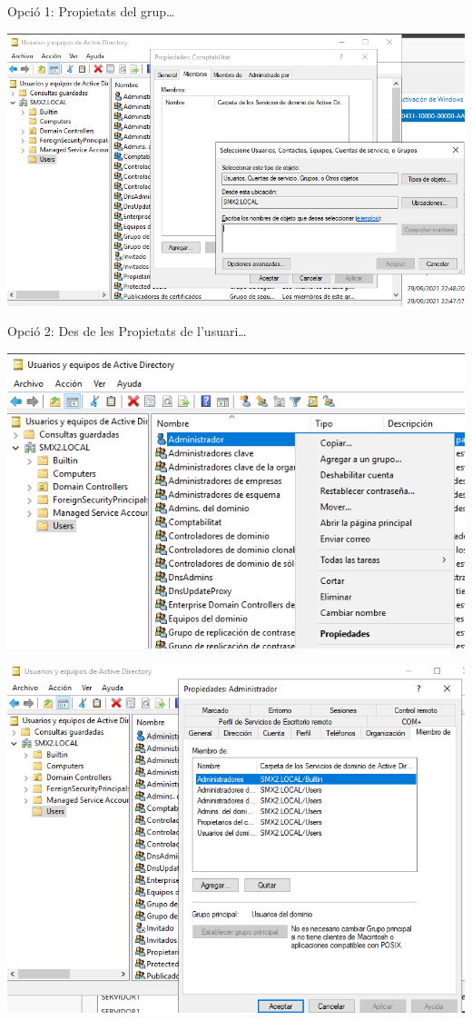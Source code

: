 \documentclass[
  a4paper,
]{article}
\begin{document}
Opció 1: Propietats del grup\ldots{}

\includegraphics{png/usuaris13.png}

Opció 2: Des de les Propietats de l'usuari\ldots{}

\includegraphics{png/usuaris14.png}

\includegraphics{png/usuaris15.png}
\end{document}
